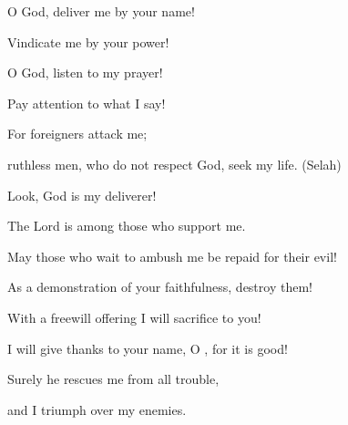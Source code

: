 {\par }{\Q {}O God,
deliver
me by your name!

\par }{\Q Vindicate
me by your power!
\par }{\Q {}O God,
listen
to my prayer!
\par }{\Q Pay
attention
to what I say!
\par }{\Q {}For
foreigners
attack me;

\par }{\Q ruthless
men, who do not
respect
God,
seek
my life.
(Selah)
\par }{\Q {}Look,
God
is my deliverer!

\par }{\Q The Lord
is among those who
support
me.
\par }{\Q {}May
those who wait
to ambush me
be repaid
for their evil!

\par }{\Q As a demonstration
of your faithfulness,
destroy them!
\par }{\Q {}With a freewill
offering I will sacrifice
to you!
\par }{\Q I will give thanks
to your name,
O
{}, for
it is good!
\par }{\Q {}Surely
he rescues
me from
all
trouble,
\par }{\Q and I triumph
over my enemies.


\par }
